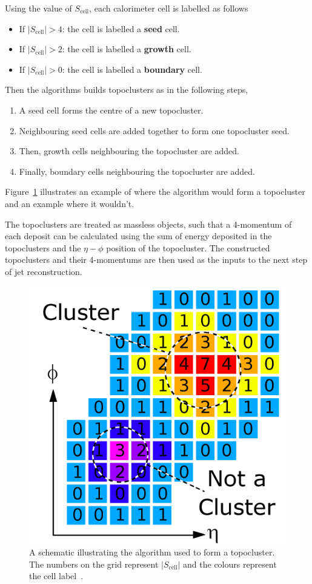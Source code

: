 \noindent
Using the value of $S_{\text{cell}}$, each calorimeter cell is labelled as follows
\begin{itemize}
\item If $|S_{\text{cell}}| > 4$: the cell is labelled a \textbf{seed} cell.
\item If $|S_{\text{cell}}| > 2$: the cell is labelled a \textbf{growth} cell.
\item If $|S_{\text{cell}}| > 0$: the cell is labelled a \textbf{boundary} cell.
\end{itemize}
Then the algorithms builds topoclusters as in the following steps,
\begin{enumerate}
\item A seed cell forms the centre of a new topocluster.
\item Neighbouring seed cells are added together to form one topocluster seed.
\item Then, growth cells neighbouring the topocluster are added.
\item Finally, boundary cells neighbouring the topocluster are added.
\end{enumerate}
Figure~\ref{fig:obj-topo_schem} illustrates an example of where the algorithm would form a topocluster and an example where it wouldn't.

The topoclusters are treated as massless objects,
such that a 4-momentum of each deposit can be calculated using the sum of energy deposited in the topoclusters
and the $\eta-\phi$ position of the topocluster.
The constructed topoclusters and their 4-momentums are then used as the inputs to the next step of jet reconstruction.

\begin{figure}[!hbt]
  \begin{center}
    \includegraphics[width=0.45\linewidth, angle=0]{figs/Objects/topo_schem.png}
  \end{center}
  \caption[A schematic illustrating the algorithm used to form a topocluster. The numbers on the grid represent $|S_{\text{cell}}|$ and the colours represent the cell label.]
          {A schematic illustrating the algorithm used to form a topocluster. The numbers on the grid represent $|S_{\text{cell}}|$ and the colours represent the cell label~\cite{det-magnet_fig}.}
  \label{fig:obj-topo_schem}
\end{figure}

